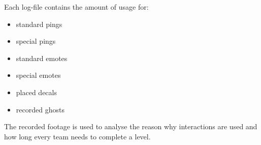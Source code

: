 Each log-file contains the amount of usage for:
\begin{itemize}
    \item standard pings
    \item special pings
    \item standard emotes
    \item special emotes
    \item placed decals
    \item recorded ghosts
\end{itemize}

The recorded footage is used to analyse the reason why interactions are used and how long every team needs to complete a level.
